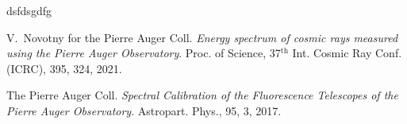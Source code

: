\documentclass[11pt,spanish]{article}
\begin{document}
dsfdsgdfg


\begin{thebibliography}{99}

V.~Novotny for the Pierre Auger Coll. \textit{Energy spectrum of cosmic rays measured using the Pierre Auger Observatory}. Proc. of Science, 37$^\text{th}$ Int. Cosmic Ray Conf. (ICRC), 395, 324, 2021.

The Pierre Auger Coll. \textit{Spectral Calibration of the Fluorescence Telescopes of the Pierre Auger Observatory}. Astropart. Phys., 95, 3, 2017.

\end{thebibliography}
\end{document}
